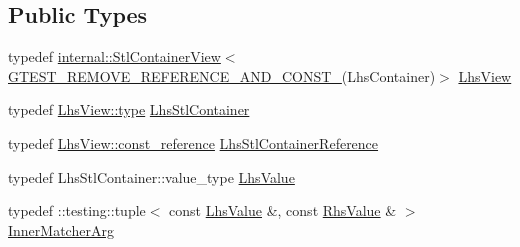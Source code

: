 \subsection*{Public Types}
\begin{DoxyCompactItemize}
\item 
typedef \hyperlink{classtesting_1_1internal_1_1StlContainerView}{internal\+::\+Stl\+Container\+View}$<$ \hyperlink{gtest-internal_8h_a874567b176266188fabfffb8393267ce}{G\+T\+E\+S\+T\+\_\+\+R\+E\+M\+O\+V\+E\+\_\+\+R\+E\+F\+E\+R\+E\+N\+C\+E\+\_\+\+A\+N\+D\+\_\+\+C\+O\+N\+S\+T\+\_\+}(Lhs\+Container)$>$ \hyperlink{classtesting_1_1internal_1_1PointwiseMatcher_1_1Impl_a5240abc710bb0a5bedfd180bf6701fae}{Lhs\+View}
\item 
typedef \hyperlink{classtesting_1_1internal_1_1StlContainerView_a2b2c63a6dcdbfe63fb0ee121ebf463ba}{Lhs\+View\+::type} \hyperlink{classtesting_1_1internal_1_1PointwiseMatcher_1_1Impl_a23420b57b4cd6d83cec8afda746c27f2}{Lhs\+Stl\+Container}
\item 
typedef \hyperlink{classtesting_1_1internal_1_1StlContainerView_a9cd4f6ed689b3938cdb7b3c4cbf1b36b}{Lhs\+View\+::const\+\_\+reference} \hyperlink{classtesting_1_1internal_1_1PointwiseMatcher_1_1Impl_a9df3eb0866f76d59dbdd35fafeb5590c}{Lhs\+Stl\+Container\+Reference}
\item 
typedef Lhs\+Stl\+Container\+::value\+\_\+type \hyperlink{classtesting_1_1internal_1_1PointwiseMatcher_1_1Impl_a453769e721f4212e399f76c980b4b65c}{Lhs\+Value}
\item 
typedef \+::testing\+::tuple$<$ const \hyperlink{classtesting_1_1internal_1_1PointwiseMatcher_1_1Impl_a453769e721f4212e399f76c980b4b65c}{Lhs\+Value} \&, const \hyperlink{classtesting_1_1internal_1_1PointwiseMatcher_a9f7f1abbfa795033e1e1c1df385b4617}{Rhs\+Value} \& $>$ \hyperlink{classtesting_1_1internal_1_1PointwiseMatcher_1_1Impl_aba9d983881cbfbb37724b8b40e863898}{Inner\+Matcher\+Arg}
\end{DoxyCompactItemize}
